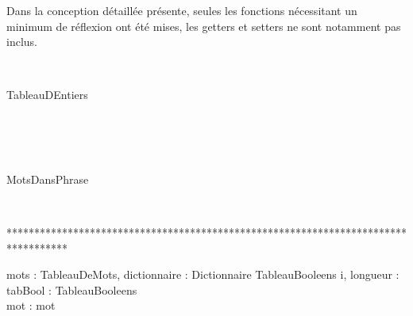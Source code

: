 \par Dans la conception d\'etaill\'ee pr\'esente, seules les fonctions n\'ecessitant un minimum de r\'eflexion ont \'et\'e mises, les getters et setters ne sont notamment pas inclus.\\


\begin{algorithme}

\\

\begin{enregistrement}{TableauDEntiers}
\end{enregistrement}\\

\\

\\

\begin{enregistrement}{MotsDansPhrase}
\end{enregistrement}\\

\end{algorithme}

***********************************************************************************

\begin{algorithme}
%
	{mots : TableauDeMots, dictionnaire : Dictionnaire}%
	{TableauBooleens}%
	{i, longueur : \naturel \\ tabBool : TableauBooleens\\ mot : mot}%
	{%
	{	
		{
		}%
		{
			}
	}%
	}\\
\end{algorithme}
	
